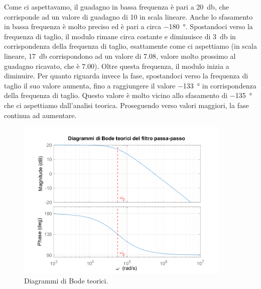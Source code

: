 \documentclass{report}
\begin{document}
Come ci aspettavamo, il guadagno in bassa frequenza è pari a \SI{20}{\decibel}, che corrisponde ad un valore di guadagno di 10 in scala lineare. Anche lo sfasamento in bassa frequenza è molto preciso ed è pari a circa \SI{-180}{\degree}. Spostandoci verso la frequenza di taglio, il modulo rimane circa costante e diminuisce di \SI{3}{\decibel} in corrispondenza della frequenza di taglio, esattamente come ci aspettiamo (in scala lineare, \SI{17}{\decibel} corrispondono ad un valore di 7.08, valore molto prossimo al guadagno ricavato, che è 7.00). Oltre questa frequenza, il modulo inizia a diminuire. Per quanto riguarda invece la fase, spostandoci verso la frequenza di taglio il suo valore aumenta, fino a raggiungere il valore \SI{-133}{\degree} in corrispondenza della frequenza di taglio. Questo valore è molto vicino allo sfasamento di \SI{-135}{\degree} che ci aspettiamo dall'analisi teorica. Proseguendo verso valori maggiori, la fase continua ad aumentare. \par
\begin{figure}[h!]
	\centering
	\includegraphics[height=7.7cm]{immagini/Bode_teo}
	\caption{Diagrammi di Bode teorici.}
	\label{figura:bodeteorici}
\end{figure}
\end{document}
